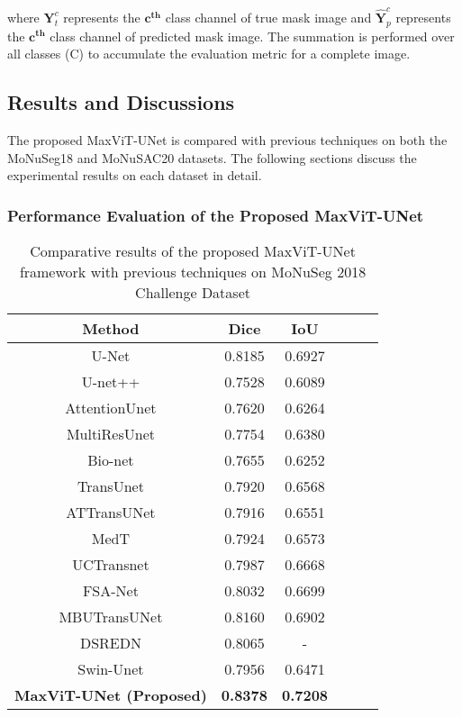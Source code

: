 \documentclass{article}
\begin{document}
where \(\textbf{Y}_{t}^{c}\) represents the \(\textbf{c}^{\textbf{th}}\) class channel of true mask image and \(\hat{\textbf{Y}}_{p}^{c}\) represents the \(\textbf{c}^{\textbf{th}}\) class channel of predicted mask image. The summation is performed over all classes (C) to accumulate the evaluation metric for a complete image.

\subsection{Results and Discussions}\label{Results and Discussions}

The proposed MaxViT-UNet is compared with previous techniques on both the MoNuSeg18 and MoNuSAC20 datasets. The following sections discuss the experimental results on each dataset in detail.

\subsubsection{Performance Evaluation of the Proposed MaxViT-UNet}\label{Performance Evaluation of the Proposed MaxViT-UNet}

\begin{table}[t!]
  \centering
  \caption{Comparative results of the proposed MaxViT-UNet framework with previous techniques on MoNuSeg 2018 Challenge Dataset}\label{table:results-monuseg18}
  \begin{tabular*}{\textwidth}{@{\extracolsep\fill}cccccc}
    \toprule Method & Dice & IoU  \\ \hline
      U-Net \cite{ronneberger2015u} & 0.8185 & 0.6927 \\
      U-net++ \cite{zhou2019unet++} & 0.7528 & 0.6089 \\
      AttentionUnet \cite{oktay2018attention} & 0.7620 & 0.6264 \\
      MultiResUnet \cite{ibtehaz2020multiresunet} & 0.7754 & 0.6380 \\
      Bio-net \cite{xiang2020bio} & 0.7655 & 0.6252 \\
      TransUnet \cite{chen2021transunet} & 0.7920 & 0.6568 \\
      ATTransUNet \cite{li2023attransunet} & 0.7916 & 0.6551 \\
      MedT \cite{valanarasu2021medical} & 0.7924 & 0.6573 \\
      UCTransnet \cite{wang2022uctransnet} & 0.7987 & 0.6668 \\
      FSA-Net \cite{zhan2023fsa} & 0.8032 & 0.6699 \\
      MBUTransUNet \cite{qiao2023mbutransnet} & 0.8160 & 0.6902 \\
      DSREDN \cite{chanchal2022deep} & 0.8065 & - \\
      Swin-Unet \cite{cao2022swin} & 0.7956 & 0.6471 \\
      \textbf{MaxViT-UNet (Proposed)} & \textbf{0.8378} & \textbf{0.7208} \\
    \hline
  \end{tabular*}
\end{table}
\end{document}

